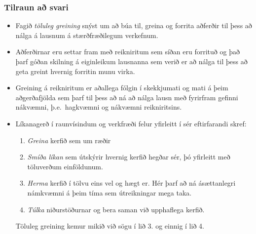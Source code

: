 \documentclass[a4paper,10pt,icelandic]{sphinxmanual}
\begin{document}
\subsubsection{Tilraun að svari}
\label{kafli01:tilraun-a-svari}\begin{itemize}
\item {} 
Fagið \emph{töluleg greining} snýst um að búa til, greina og forrita
aðferðir til þess að nálga á lausnum á stærðfræðilegum verkefnum.

\item {} 
Aðferðirnar eru settar fram með reikniritum sem síðan eru forrituð og
það þarf góðan skilning á eiginleikum lausnanna sem verið er að nálga
til þess að geta greint hvernig forritin munu virka.

\item {} 
Greining á reikniritum er aðallega fólgin í skekkjumati og mati á
þeim aðgerðafjölda sem þarf til þess að ná að nálga lausn með
fyrirfram gefinni nákvæmni, þ.e. hagkvæmni og nákvæmni reikniritsins.

\item {} 
Líkanagerð í raunvísindum og verkfræði felur yfirleitt í sér eftirfarandi skref:
\begin{enumerate}
\item {} 
\emph{Greina} kerfið sem um ræðir

\item {} 
\emph{Smíða líkan} sem útskýrir hvernig kerfið hegðar sér, þó yfirleitt með töluverðum einföldunum.

\item {} 
\emph{Herma} kerfið í tölvu eins vel og hægt er. Hér þarf að ná ásættanlegri námkvæmni á þeim tíma sem útreikningar mega taka.

\item {} 
\emph{Túlka} niðurstöðurnar og bera saman við upphaflega kerfið.

\end{enumerate}

Töluleg greining kemur mikið við sögu í lið 3. og einnig í lið 4.

\end{itemize}
\end{document}

